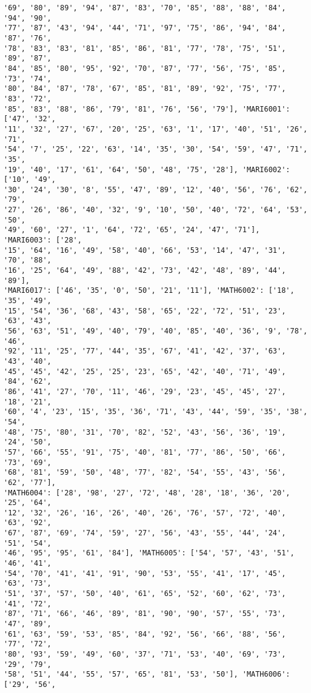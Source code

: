 \documentclass[11pt]{article}
\begin{document}
\begin{Verbatim}[commandchars=\\\{\}]
'69', '80', '89', '94', '87', '83', '70', '85', '88', '88', '84', '94', '90',
'77', '87', '43', '94', '44', '71', '97', '75', '86', '94', '84', '87', '76',
'78', '83', '83', '81', '85', '86', '81', '77', '78', '75', '51', '89', '87',
'84', '85', '80', '95', '92', '70', '87', '77', '56', '75', '85', '73', '74',
'80', '84', '87', '78', '67', '85', '81', '89', '92', '75', '77', '83', '72',
'85', '83', '88', '86', '79', '81', '76', '56', '79'], 'MARI6001': ['47', '32',
'11', '32', '27', '67', '20', '25', '63', '1', '17', '40', '51', '26', '71',
'54', '7', '25', '22', '63', '14', '35', '30', '54', '59', '47', '71', '35',
'19', '40', '17', '61', '64', '50', '48', '75', '28'], 'MARI6002': ['10', '49',
'30', '24', '30', '8', '55', '47', '89', '12', '40', '56', '76', '62', '79',
'27', '26', '86', '40', '32', '9', '10', '50', '40', '72', '64', '53', '50',
'49', '60', '27', '1', '64', '72', '65', '24', '47', '71'], 'MARI6003': ['28',
'15', '64', '16', '49', '58', '40', '66', '53', '14', '47', '31', '70', '88',
'16', '25', '64', '49', '88', '42', '73', '42', '48', '89', '44', '89'],
'MARI6017': ['46', '35', '0', '50', '21', '11'], 'MATH6002': ['18', '35', '49',
'15', '54', '36', '68', '43', '58', '65', '22', '72', '51', '23', '63', '43',
'56', '63', '51', '49', '40', '79', '40', '85', '40', '36', '9', '78', '46',
'92', '11', '25', '77', '44', '35', '67', '41', '42', '37', '63', '43', '40',
'45', '45', '42', '25', '25', '23', '65', '42', '40', '71', '49', '84', '62',
'86', '41', '27', '70', '11', '46', '29', '23', '45', '45', '27', '18', '21',
'60', '4', '23', '15', '35', '36', '71', '43', '44', '59', '35', '38', '54',
'48', '75', '80', '31', '70', '82', '52', '43', '56', '36', '19', '24', '50',
'57', '66', '55', '91', '75', '40', '81', '77', '86', '50', '66', '73', '69',
'68', '81', '59', '50', '48', '77', '82', '54', '55', '43', '56', '62', '77'],
'MATH6004': ['28', '98', '27', '72', '48', '28', '18', '36', '20', '25', '64',
'12', '32', '26', '16', '26', '40', '26', '76', '57', '72', '40', '63', '92',
'67', '87', '69', '74', '59', '27', '56', '43', '55', '44', '24', '51', '54',
'46', '95', '95', '61', '84'], 'MATH6005': ['54', '57', '43', '51', '46', '41',
'54', '70', '41', '41', '91', '90', '53', '55', '41', '17', '45', '63', '73',
'51', '37', '57', '50', '40', '61', '65', '52', '60', '62', '73', '41', '72',
'87', '71', '66', '46', '89', '81', '90', '90', '57', '55', '73', '47', '89',
'61', '63', '59', '53', '85', '84', '92', '56', '66', '88', '56', '77', '72',
'80', '93', '59', '49', '60', '37', '71', '53', '40', '69', '73', '29', '79',
'58', '51', '44', '55', '57', '65', '81', '53', '50'], 'MATH6006': ['29', '56',

\end{Verbatim}
\end{document}

